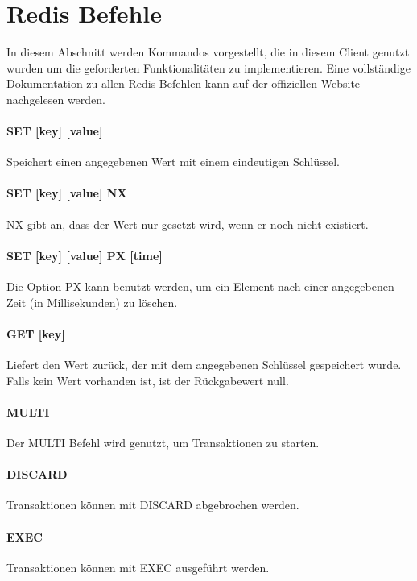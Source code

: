 \documentclass[12pt, letterpaper]{article}
\begin{document}
\section{Redis Befehle}
In diesem Abschnitt werden Kommandos vorgestellt, die in diesem Client genutzt wurden um die geforderten Funktionalitäten zu implementieren. Eine vollständige Dokumentation zu allen Redis-Befehlen kann auf der offiziellen Website\cite{redis_commands} nachgelesen werden.

\paragraph{SET [key] [value]}
Speichert einen angegebenen Wert mit einem eindeutigen Schlüssel.

\paragraph{SET [key] [value] NX}
NX gibt an, dass der Wert nur gesetzt wird, wenn er noch nicht existiert.

\paragraph{SET [key] [value] PX [time]}
Die Option PX kann benutzt werden, um ein Element nach einer angegebenen Zeit (in Millisekunden) zu löschen.

\paragraph{GET [key]}
Liefert den Wert zurück, der mit dem angegebenen Schlüssel gespeichert wurde. Falls kein Wert vorhanden ist, ist der Rückgabewert null.

\paragraph{MULTI}
Der MULTI Befehl wird genutzt, um Transaktionen zu starten.

\paragraph{DISCARD}
Transaktionen können mit DISCARD abgebrochen werden.

\paragraph{EXEC}
Transaktionen können mit EXEC ausgeführt werden.
\end{document}
